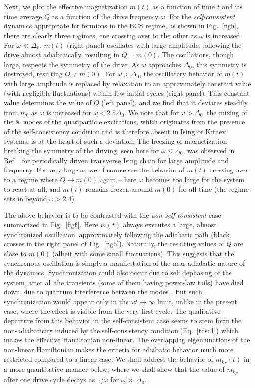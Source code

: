 \documentclass[a4paper,10pt]{report}
\begin{document}
Next, we plot the effective magnetization $m(t)$ as a function of
time $t$ and its time average $Q$ as a function of the drive
frequency $\omega$. For the {\it self-consistent} dynamics
appropriate for fermions in the BCS regime, as shown in Fig.\
\ref{fig5}, there are clearly three regimes, one crossing over to
the other as $\omega$ is increased. For $\omega \ll \Delta_{0}$,
$m(t)$ (right panel) oscillates with large amplitude, following the
drive almost adiabatically, resulting in $Q = m(0)$. The
oscillations, though large, respects the symmetry of the drive. As
$\omega$ approaches $\Delta_{0}$, this symmetry is destroyed,
resulting $Q \ne m(0)$. For $\omega > \Delta_{0}$, the oscillatory
behavior of $m(t)$ with large amplitude is replaced by relaxation to
an approximately constant value (with negligible fluctuations)
within few initial cycles (right panel). This constant value
determines the value of $Q$ (left panel), and we find that it
deviates steadily from $m_{0}$ as $\omega$ is increased for $\omega
< 2.5 \Delta_0$. We note that for $\omega > \Delta_0$, the mixing of
the ${\bf k}$ modes of the quasiparticle excitations, which
originates from the presence of the self-consistency condition and
is therefore absent in Ising or Kitaev systems, is at the heart of
such a deviation. The freezing of magnetization breaking the
symmetry of the driving, seen here for $\omega \le \Delta_0$, was
observed in Ref.\ \cite{arnab1} for periodically driven
transverse Ising chain for large amplitude and frequency. For very
large $\omega$, we of course see the behavior of $m(t)$ crossing
over to a regime where $Q \rightarrow m(0)$ again -- here $\omega$
becomes too large for the system to react at all, and $m(t)$ remains
frozen around $m(0)$ for all time (the regime sets in beyond $\omega
> 2.4$).

The above behavior is to be contrasted with the {\it
non-self-consistent} case summarized in Fig.\ \ref{fig6}. Here
$m(t)$ always executes a large, almost synchronized oscillation,
approximately following the adiabatic path (black crosses in the
right panel of Fig.\ \ref{fig6}). Naturally, the resulting values of
$Q$ are close to $m(0)$ (albeit with some small fluctuations). This
suggests that the synchronous oscillation is simply a manifestation
of the near-adiabatic nature of the dynamics. Synchronization could
also occur due to self dephasing of the system, after all the
transients (some of them having power-law tails) have died down, due
to quantum interference between the modes \cite{arnab1}.
But such synchronization would appear only in the $\omega t
\rightarrow \infty$ limit, unlike in the present case, where the
effect is visible from the very first cycle. The qualitative
departure from this behavior in the self-consistent case seems to
stem form the non-adiabaticity induced by the self-consistency
condition (Eq.\ \ref{tdsc1}) which makes the effective Hamiltonian
non-linear. The overlapping eigenfunctions of the non-linear
Hamiltonian makes the criteria for adiabatic behavior much more
restricted compared to a linear case. We shall address the behavior of $m_{k_F}(t)$
in a more quantitative manner below, where we
shall show that the value of $m_{k_F}$ after one drive cycle decays
as $1/\omega$ for $\omega \gg \Delta_0$.
\end{document}
